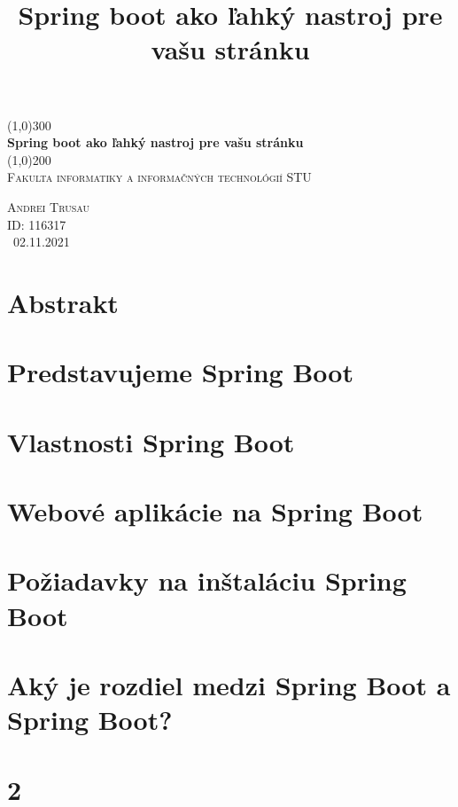 \documentclass[12pt, letterpaper]{article}
\begin{document}
\begin{titlepage}
	\begin{center}	
	\line(1,0){300} \\
	[0.25in]
	\huge{\bfseries \huge Spring boot ako ľahký nastroj pre vašu stránku} \\
	[2mm]
	\line(1,0){200} \\
	[0.5cm]
	\textsc{\LARGE Fakulta informatiky a informačných technológií STU} \\
	[7cm]
	\end{center}
	\begin{flushright}
	\textsc{\large Andrei Trusau \\
	ID: 116317 \\
	\ 02.11.2021 \\}
	\end{flushright}
\end{titlepage}

\section{Abstrakt}






\title{Spring boot ako ľahký nastroj pre vašu stránku}
\maketitle

\section{Predstavujeme Spring Boot}

\section{Vlastnosti Spring Boot}

\section{Webové aplikácie na Spring Boot}

\section{Požiadavky na inštaláciu Spring Boot}

\section{Aký je rozdiel medzi Spring Boot a Spring Boot?}

\section{2}
\end{document}
